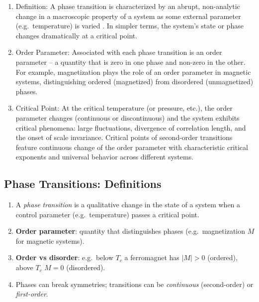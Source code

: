 \documentclass[%
oneside,                 %
final,                   %
10pt]{article}
\begin{document}
\begin{enumerate}
\item Definition: A phase transition is characterized by an abrupt, non-analytic change in a macroscopic property of a system as some external parameter (e.g.~temperature) is varied . In simpler terms, the system’s state or phase changes dramatically at a critical point.

\item Order Parameter: Associated with each phase transition is an order parameter – a quantity that is zero in one phase and non-zero in the other. For example, magnetization plays the role of an order parameter in magnetic systems, distinguishing ordered (magnetized) from disordered (unmagnetized) phases.

\item Critical Point: At the critical temperature (or pressure, etc.), the order parameter changes (continuous or discontinuous) and the system exhibits critical phenomena: large fluctuations, divergence of correlation length, and the onset of scale invariance. Critical points of second-order transitions feature continuous change of the order parameter with characteristic critical exponents and universal behavior across different systems.
\end{enumerate}

\noindent
\subsection{Phase Transitions: Definitions}
\begin{enumerate}
\item A \emph{phase transition} is a qualitative change in the state of a system when a control parameter (e.g.\ temperature) passes a critical point.

\item \textbf{Order parameter}: quantity that distinguishes phases (e.g.\ magnetization $M$ for magnetic systems).

\item \textbf{Order vs disorder}: e.g.\ below $T_c$ a ferromagnet has $|M|>0$ (ordered), above $T_c$ $M=0$ (disordered).

\item Phases can break symmetries; transitions can be \emph{continuous} (second-order) or \emph{first-order}.
\end{enumerate}

\noindent
\end{document}
